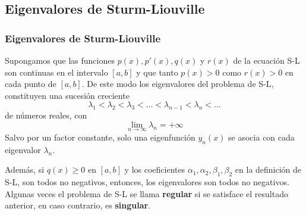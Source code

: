 \subsection{Eigenvalores de Sturm-Liouville}
\begin{frame}
\frametitle{Eigenvalores de Sturm-Liouville}
Supongamos que las funciones $p(x), p'(x),q(x)$ y $r(x)$ de la ecuaci\'{o}n S-L son continuas en el intervalo $[a,b]$ y que tanto $p(x)>0$ como $r(x)>0$ en cada punto de $[a,b]$. De este modo los eigenvalores del problema de S-L, constituyen una sucesi\'{o}n creciente
\[ \lambda_{1} < \lambda_{2} < \lambda_{3} < \ldots < \lambda_{n-1} < \lambda_{n} < \ldots\]
de n\'{u}meros reales, con
\[ \lim_{n \rightarrow \infty} \lambda_{n} = + \infty\]
Salvo por un factor constante, solo una eigenfunci\'{o}n $y_{n}(x)$ se asocia con cada eigenvalor $\lambda_{n}$.
\end{frame}
\begin{frame}
Adem\'{a}s, si $q(x) \geq 0$ en $[a,b]$ y los coeficientes $\alpha_{1},\alpha_{2},\beta_{1},\beta_{2}$ en la definici\'{o}n de S-L, son todos no negativos, entonces, los eigenvalores son todos no negativos.
\\
\bigskip
Algunas veces el problema de S-L se llama \textbf{regular} si se satisface el resultado anterior, en caso contrario, es \textbf{singular}.
\end{frame}
